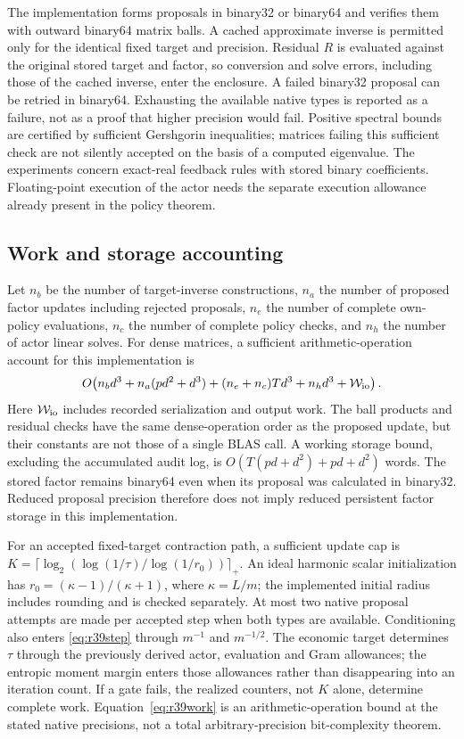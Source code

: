 \documentclass[ecta,nameyear,draft]{econsocart}
\theoremstyle{definition}
\theoremstyle{remark}
\begin{document}
The implementation forms proposals in binary32 or binary64 and verifies them
with outward binary64 matrix balls. A cached approximate inverse is permitted
only for the identical fixed target and precision. Residual $R$ is evaluated
against the original stored target and factor, so conversion and solve errors,
including those of the cached inverse, enter the enclosure. A failed binary32
proposal can be retried in binary64. Exhausting the available native types is
reported as a failure, not as a proof that higher precision would fail.
Positive spectral bounds are certified by sufficient Gershgorin inequalities;
matrices failing this sufficient check are not silently accepted on the basis
of a computed eigenvalue. The experiments concern exact-real feedback rules
with stored binary coefficients. Floating-point execution of the actor needs
the separate execution allowance already present in the policy theorem.

\subsection{Work and storage accounting}
Let $n_b$ be the number of target-inverse constructions, $n_a$ the number of
proposed factor updates including rejected proposals, $n_e$ the number of
complete own-policy evaluations, $n_c$ the number of complete policy checks,
and $n_h$ the number of actor linear solves. For dense matrices, a sufficient
arithmetic-operation account for this implementation is
\begin{equation}\label{eq:r39work}
 O\!\left(n_bd^3+n_a(pd^2+d^3)
              +(n_e+n_c)Td^3+n_hd^3+\mathcal W_{\rm io}\right).
\end{equation}
Here $\mathcal W_{\rm io}$ includes recorded serialization and output work.
The ball products and residual checks have the same dense-operation order as
the proposed update, but their constants are not those of a single BLAS call.
A working storage bound, excluding the accumulated audit log, is
$O(T(pd+d^2)+pd+d^2)$ words. The stored factor remains binary64 even when its
proposal was calculated in binary32. Reduced proposal precision therefore does
not imply reduced persistent factor storage in this implementation.

For an accepted fixed-target contraction path, a sufficient update cap is
$K=\lceil\log_2(\log(1/\tau)/\log(1/r_0))\rceil_+$.
An ideal harmonic scalar initialization has
$r_0=(\kappa-1)/(\kappa+1)$, where $\kappa=L/m$; the implemented initial
radius includes rounding and is checked separately. At most two native
proposal attempts are made per accepted step when both types are available.
Conditioning also enters \eqref{eq:r39step} through $m^{-1}$ and $m^{-1/2}$.
The economic target determines $\tau$ through the previously derived actor,
evaluation and Gram allowances; the entropic moment margin enters those
allowances rather than disappearing into an iteration count. If a gate fails,
the realized counters, not $K$ alone, determine complete work.
Equation~\eqref{eq:r39work} is an arithmetic-operation bound at the stated
native precisions, not a total arbitrary-precision bit-complexity theorem.
\end{document}

